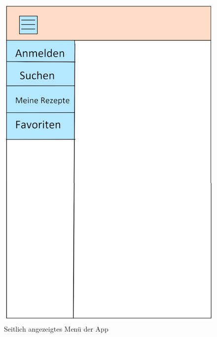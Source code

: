 \begin{figure}[H]
	\begin{minipage}[c]{.5\textwidth} 
		\includegraphics[width=\textwidth]{gui/seitenmenue.png}			
		\caption{Seitlich angezeigtes Menü der App}
		\label{menü}
	\end{minipage} \hspace{.7cm}
	\begin{minipage}[c]{.5\textwidth} 

\end{minipage}
\end{figure}
